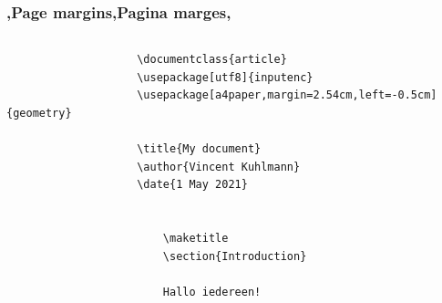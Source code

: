         
%         
            
%         

\unless\ifishandout
\begin{frame}[fragile]
    \frametitle{\lang,Page margins,Pagina marges,}
    \begin{columns}
        \begin{column}{0.67\textwidth}
            \begin{codebox}
                \begin{verbatim}
                    \documentclass{article}
                    \usepackage[utf8]{inputenc}
                    \usepackage[a4paper,margin=2.54cm,left=-0.5cm]{geometry}
                    
                    \title{My document}
                    \author{Vincent Kuhlmann}
                    \date{1 May 2021}
                    
                    
                        \maketitle
                        \section{Introduction}
                        
                        Hallo iedereen!
                    

\end{verbatim}
\end{codebox}
\end{column}
\end{columns}
\end{frame}
